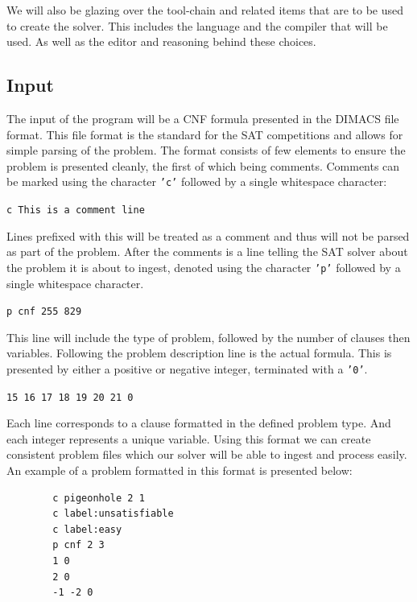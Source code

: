 \documentclass{article}
\begin{document}
We will also be glazing over the tool-chain and related items that are to be used to create the
solver. This includes the language and the compiler that will be used. As well as the editor and
reasoning behind these choices.

\subsection{Input}
The input of the program will be a CNF formula presented in the DIMACS file format. This file format
is the standard for the SAT competitions and allows for simple parsing of the problem. The format
consists of few elements to ensure the problem is presented cleanly, the first of which being
comments. Comments can be marked using the character \texttt{'c'} followed by a single whitespace
character:

\begin{center}
    \texttt{c This is a comment line}
\end{center}

Lines prefixed with this will be treated as a
comment and thus will not be parsed as part of the problem. After the comments is a line telling the
SAT solver about the problem it is about to ingest, denoted using the character \texttt{'p'}
followed by a single whitespace character.

\begin{center}
    \texttt{p cnf 255 829}
\end{center}

This line will include the type of problem, followed by the number of clauses then
variables. Following the problem description line is the actual formula. This is presented by either
a positive or negative integer, terminated with a \texttt{'0'}.

\begin{center}
    \texttt{15 16 17 18 19 20 21 0}
\end{center}

Each line corresponds to a clause formatted in the defined problem type. And each integer represents
a unique variable. Using this format we can create consistent problem files which our solver will be
able to ingest and process easily. An example of a problem formatted in this format is presented
below:

\begin{center}
    \begin{lstlisting}
        c pigeonhole 2 1
        c label:unsatisfiable
        c label:easy
        p cnf 2 3
        1 0
        2 0
        -1 -2 0
    \end{lstlisting}
\end{center}
\end{document}
